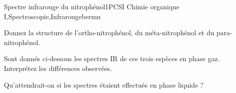
\begin{exercise}{Spectre infrarouge du nitrophénol}{1}{PCSI}
{Chimie organique I,Spectroscopie,Infrarouge}{bermu}

\begin{questions}
    \question Donnez la structure de l'ortho-nitrophénol, du méta-nitrophénol et du para-nitrophénol.

    \question Sont donnés ci-dessous les spectres IR de ces trois espèces en phase gaz. Interprétez les différences observées.
    
    
    \question Qu'attendrait-on si les spectres étaient effectués en phase liquide ?
\end{questions}
\end{exercise}